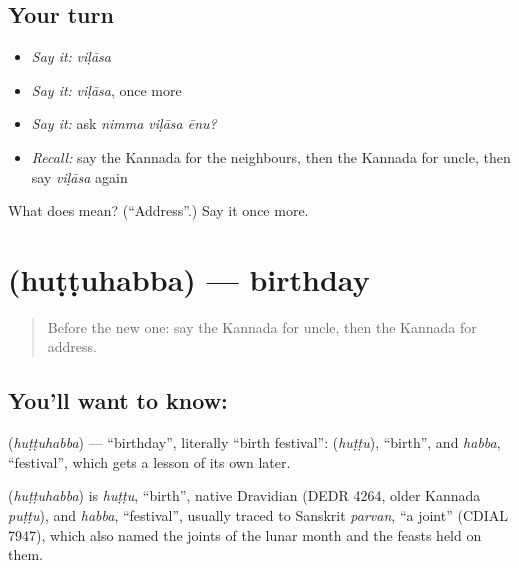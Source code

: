 \subsection*{Your turn}
\begin{itemize}
\raggedright
  \item \emph{Say it:} \emph{viḷāsa}
  \item \emph{Say it:} \emph{viḷāsa}, once more
  \item \emph{Say it:} ask \emph{nimma viḷāsa ēnu?}
  \item \emph{Recall:} say the Kannada for the neighbours, then the Kannada for uncle, then say \emph{viḷāsa} again
\end{itemize}

\begin{tcolorbox}[breakable,colback=teal!4,colframe=teal!35!black,title={Before you move on}]
What does  mean? (\textquotedblleft{}Address\textquotedblright{}.) Say it once more.
\end{tcolorbox}
\section[\texorpdfstring{\kn{ಹುಟ್ಟುಹಬ್ಬ} (huṭṭuhabba)}{ಹುಟ್ಟುಹಬ್ಬ (huṭṭuhabba)}]{ (huṭṭuhabba) — birthday}

\label{lesson:KA-C91-birthday}



\begin{quote}
Before the new one: say the Kannada for uncle, then the Kannada for address.
\end{quote}

\subsection*{You'll want to know: }
\textbf{} (\emph{huṭṭuhabba}) — \textquotedblleft{}birthday\textquotedblright{}, literally \textquotedblleft{}birth festival\textquotedblright{}: \textbf{} (\emph{huṭṭu}), \textquotedblleft{}birth\textquotedblright{}, and \emph{habba}, \textquotedblleft{}festival\textquotedblright{}, which gets a lesson of its own later.

\begin{cousinweb}
\textbf{} (\emph{huṭṭuhabba}) is \emph{huṭṭu}, \textquotedblleft{}birth\textquotedblright{}, native Dravidian (DEDR 4264, older Kannada \emph{puṭṭu}), and \emph{habba}, \textquotedblleft{}festival\textquotedblright{}, usually traced to Sanskrit \emph{parvan}, \textquotedblleft{}a joint\textquotedblright{} (CDIAL 7947), which also named the joints of the lunar month and the feasts held on them.
\end{cousinweb}

